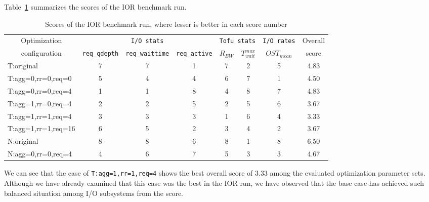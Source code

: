 \documentclass{jhps}
\begin{document}
Table~\ref{tbl:IOR_OVERALL_EVAL} summarizes the scores of the IOR benchmark run.
%
\begin{table}[tb]
\caption{Scores of the IOR benchmark run, where lesser is better in each score number}
\centering
\begin{tabular}{lccccccc}
\hline
\multicolumn{1}{c}{Optimization}  & \multicolumn{3}{c}{{\tt I/O stats}} & \multicolumn{2}{c}{{\tt Tofu stats}} & {\tt I/O rates} & Overall \\
\multicolumn{1}{c}{configuration} & {\tt req\_qdepth} & {\tt req\_waittime} & {\tt req\_active} &  $R_{BW}$ & $T_{wait}^{max}$ & $OST_{mean}$ & score \\
\hline
T:original          & 7 & 7 & 1 & 7 & 2 & 5 & 4.83 \\
T:agg=0,rr=0,req=0  & 5 & 4 & 4 & 6 & 7 & 1 & 4.50 \\
T:agg=0,rr=0,req=4  & 1 & 1 & 8 & 4 & 8 & 7 & 4.83 \\
T:agg=1,rr=0,req=4  & 2 & 2 & 5 & 2 & 5 & 6 & 3.67 \\
T:agg=1,rr=1,req=4  & 3 & 3 & 3 & 1 & 6 & 4 & 3.33 \\
T:agg=1,rr=1,req=16 & 6 & 5 & 2 & 3 & 4 & 2 & 3.67 \\
N:original          & 8 & 8 & 6 & 8 & 1 & 8 & 6.50 \\
N:agg=0,rr=0,req=4  & 4 & 6 & 7 & 5 & 3 & 3 & 4.67 \\
\hline
\end{tabular}
\label{tbl:IOR_OVERALL_EVAL}
\end{table}
%
We can see that the case of {\tt T:agg=1,rr=1,req=4} shows the best overall score
of 3.33 among the evaluated optimization parameter sets.
Although we have already examined that this case was the best in the IOR run,
we have observed that the base case has achieved such balanced situation
among I/O subsystems from the score.
\end{document}
